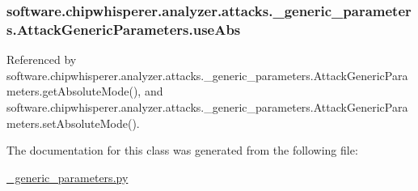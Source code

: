\subsubsection[{use\+Abs}]{\setlength{\rightskip}{0pt plus 5cm}software.\+chipwhisperer.\+analyzer.\+attacks.\+\_\+generic\+\_\+parameters.\+Attack\+Generic\+Parameters.\+use\+Abs}\label{classsoftware_1_1chipwhisperer_1_1analyzer_1_1attacks_1_1__generic__parameters_1_1AttackGenericParameters_aea7b21b5cfca1b53fc85f20c1138f917}


Referenced by software.\+chipwhisperer.\+analyzer.\+attacks.\+\_\+generic\+\_\+parameters.\+Attack\+Generic\+Parameters.\+get\+Absolute\+Mode(), and software.\+chipwhisperer.\+analyzer.\+attacks.\+\_\+generic\+\_\+parameters.\+Attack\+Generic\+Parameters.\+set\+Absolute\+Mode().



The documentation for this class was generated from the following file\+:\begin{DoxyCompactItemize}
\item 
\hyperlink{__generic__parameters_8py}{\+\_\+generic\+\_\+parameters.\+py}\end{DoxyCompactItemize}
